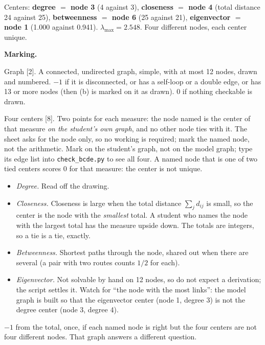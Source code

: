 \documentclass[a4paper, 11pt]{extarticle}
\newcommand{\ans}[1]{{\color{pltblue}\bfseries #1}}
\begin{document}
Centers: \ans{degree $=$ node 3} (4 against 3), \ans{closeness $=$ node 4}
(total distance 24 against 25), \ans{betweenness $=$ node 6} (25 against 21),
\ans{eigenvector $=$ node 1} (1.000 against 0.941). $\lambda_{\max} = 2.548$.
Four different nodes, each center unique.

\textbf{Marking.}

Graph [2]. A connected, undirected graph, simple, with at most 12 nodes, drawn and
numbered. $-1$ if it is disconnected, or has a self-loop or a double edge, or
has 13 or more nodes (then (b) is marked on it as drawn). $0$ if nothing
checkable is drawn.

Four centers [8]. Two points for each measure: the node named is the center of
that measure \emph{on the student's own graph}, and no other node ties with it.
The sheet asks for the node only, so no working is required; mark the named node,
not the arithmetic. Mark on the student's graph, not on the model graph; type its
edge list into \texttt{check\_bcde.py} to see all four. A named node that is one of
two tied centers scores $0$ for that measure: the center is not unique.
\begin{itemize}[leftmargin=1.4em, itemsep=0.1em, topsep=0.2em]
  \item \emph{Degree.} Read off the drawing.
  \item \emph{Closeness.} Closeness is large when the total distance
        $\sum_j d_{ij}$ is small, so the center is the node with the
        \emph{smallest} total. A student who names the node with the largest
        total has the measure upside down. The totals are integers, so a tie is
        a tie, exactly.
  \item \emph{Betweenness.} Shortest paths through the node, shared out when
        there are several (a pair with two routes counts $1/2$ for each).
  \item \emph{Eigenvector.} Not solvable by hand on 12 nodes, so do not expect a
        derivation; the script settles it. Watch for ``the node with the most
        links'': the model graph is built so that the eigenvector center (node
        1, degree 3) is not the degree center (node 3, degree 4).
\end{itemize}
$-1$ from the total, once, if each named node is right but the four centers are
not four different nodes. That graph answers a different question.
\end{document}
